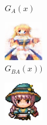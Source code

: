 \documentclass{beamer}
\begin{document}
\begin{frame}
\begin{figure}[htb]
\begin{subfigure}[b]{0.23\linewidth}
        \caption{$G_A(x)$}
      \end{subfigure}
      \begin{subfigure}[b]{0.23\linewidth}
        \includegraphics[width=\linewidth]{exp2_epoch060_rec_A.png}
        \caption{$G_{BA}(x))$}
      \end{subfigure}
      \begin{subfigure}[b]{0.23\linewidth}
        \includegraphics[width=\linewidth]{exp2_epoch060_idt_A.png}

\end{subfigure}
\end{figure}
\end{frame}
\end{document}
